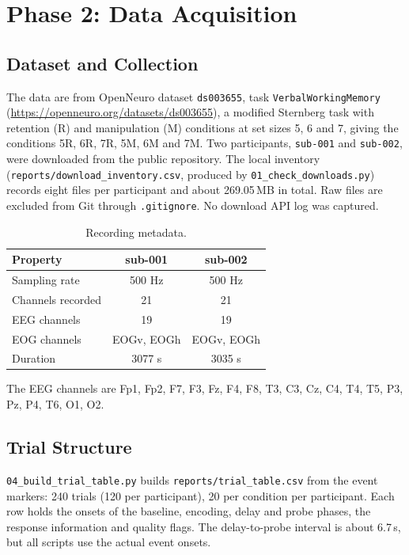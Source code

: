 \documentclass[11pt,a4paper]{article}
\begin{document}
\section{Phase 2: Data Acquisition}

\subsection{Dataset and Collection}
The data are from OpenNeuro dataset \texttt{ds003655}, task \texttt{VerbalWorkingMemory}
(\url{https://openneuro.org/datasets/ds003655}), a modified Sternberg task with retention (R) and manipulation (M)
conditions at set sizes 5, 6 and 7, giving the conditions 5R, 6R, 7R, 5M, 6M and 7M. Two participants,
\texttt{sub-001} and \texttt{sub-002}, were downloaded from the public repository. The local inventory
(\texttt{reports/download\_inventory.csv}, produced by \texttt{01\_check\_downloads.py}) records eight files per
participant and about 269.05\,MB in total. Raw files are excluded from Git through \texttt{.gitignore}. No download
API log was captured.

\begin{table}[H]\centering
\caption{Recording metadata.}
\begin{tabular}{lcc}
\toprule
Property & sub-001 & sub-002 \\
\midrule
Sampling rate & 500 Hz & 500 Hz \\
Channels recorded & 21 & 21 \\
EEG channels & 19 & 19 \\
EOG channels & EOGv, EOGh & EOGv, EOGh \\
Duration & 3077 s & 3035 s \\
\bottomrule
\end{tabular}
\end{table}
The EEG channels are Fp1, Fp2, F7, F3, Fz, F4, F8, T3, C3, Cz, C4, T4, T5, P3, Pz, P4, T6, O1, O2.

\subsection{Trial Structure}
\texttt{04\_build\_trial\_table.py} builds \texttt{reports/trial\_table.csv} from the event markers: 240 trials
(120 per participant), 20 per condition per participant. Each row holds the onsets of the baseline, encoding, delay
and probe phases, the response information and quality flags. The delay-to-probe interval is about 6.7\,s, but all
scripts use the actual event onsets.
\end{document}
